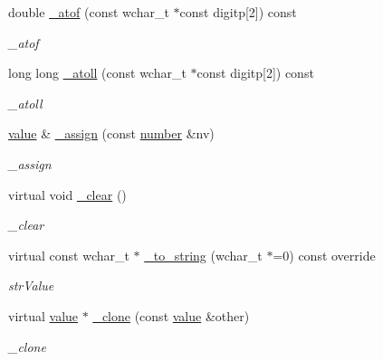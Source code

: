 \begin{DoxyCompactItemize}
double \hyperlink{classformat_1_1number_a5ea6797181571045ad80166c7312f879}{\+\_\+atof} (const wchar\+\_\+t $\ast$const digitp\mbox{[}2\mbox{]}) const 
\begin{DoxyCompactList}\small\item\em \+\_\+atof \end{DoxyCompactList}\item 
long long \hyperlink{classformat_1_1number_a454b958042621f103643c62de6bd3354}{\+\_\+atoll} (const wchar\+\_\+t $\ast$const digitp\mbox{[}2\mbox{]}) const 
\begin{DoxyCompactList}\small\item\em \+\_\+atoll \end{DoxyCompactList}\item 
\hyperlink{classformat_1_1value_aa6b85823936bf7b8ab78d3f8d443c00d}{value} \& \hyperlink{classformat_1_1number_adceec31ec4867ed381c7fbd1ec1ad8ae}{\+\_\+assign} (const \hyperlink{classformat_1_1number}{number} \&nv)
\begin{DoxyCompactList}\small\item\em \+\_\+assign \end{DoxyCompactList}\item 
virtual void \hyperlink{classformat_1_1number_ab66bc772f00069e47a04f3ebc2f48db7}{\+\_\+clear} ()\hypertarget{classformat_1_1number_ab66bc772f00069e47a04f3ebc2f48db7}{}\label{classformat_1_1number_ab66bc772f00069e47a04f3ebc2f48db7}

\begin{DoxyCompactList}\small\item\em \+\_\+clear \end{DoxyCompactList}\item 
virtual const wchar\+\_\+t $\ast$ \hyperlink{classformat_1_1number_a19023252f46d9589a4fc5b960b7c8b2b}{\+\_\+to\+\_\+string} (wchar\+\_\+t $\ast$=0) const override
\begin{DoxyCompactList}\small\item\em str\+Value \end{DoxyCompactList}\item 
virtual \hyperlink{classformat_1_1value_aa6b85823936bf7b8ab78d3f8d443c00d}{value} $\ast$ \hyperlink{classformat_1_1number_a995497a87887619195ebb4f96e7faa88}{\+\_\+clone} (const \hyperlink{classformat_1_1value_aa6b85823936bf7b8ab78d3f8d443c00d}{value} \&other)
\begin{DoxyCompactList}\small\item\em \+\_\+clone \end{DoxyCompactList}\end{DoxyCompactItemize}
